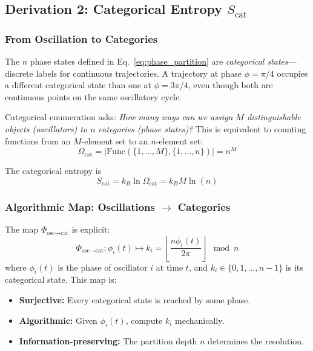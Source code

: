 \documentclass[twocolumn,10pt]{article}
\theoremstyle{remark}
\begin{document}
\subsection{Derivation 2: Categorical Entropy $S_{\text{cat}}$}

\subsubsection{From Oscillation to Categories}

The $n$ phase states defined in Eq.~\eqref{eq:phase_partition} are \textit{categorical states}—discrete labels for continuous trajectories. A trajectory at phase $\phi = \pi/4$ occupies a different categorical state than one at $\phi = 3\pi/4$, even though both are continuous points on the same oscillatory cycle.

Categorical enumeration asks: \textit{How many ways can we assign $M$ distinguishable objects (oscillators) to $n$ categories (phase states)?} This is equivalent to counting functions from an $M$-element set to an $n$-element set:
\begin{equation}
    \Omega_{\text{cat}} = |\text{Func}(\{1,\ldots,M\}, \{1,\ldots,n\})| = n^M
    \label{eq:Omega_cat}
\end{equation}

The categorical entropy is
\begin{equation}
    S_{\text{cat}} = k_B \ln \Omega_{\text{cat}} = k_B M \ln(n)
    \label{eq:S_cat_derivation}
\end{equation}

\subsubsection{Algorithmic Map: Oscillations $\to$ Categories}

The map $\Phi_{\text{osc} \to \text{cat}}$ is explicit:
\begin{equation}
    \Phi_{\text{osc} \to \text{cat}}: \phi_i(t) \mapsto k_i = \left\lfloor \frac{n \phi_i(t)}{2\pi} \right\rfloor \mod n
    \label{eq:map_osc_to_cat}
\end{equation}
where $\phi_i(t)$ is the phase of oscillator $i$ at time $t$, and $k_i \in \{0, 1, \ldots, n-1\}$ is its categorical state. This map is:
\begin{itemize}
    \item \textbf{Surjective:} Every categorical state is reached by some phase.
    \item \textbf{Algorithmic:} Given $\phi_i(t)$, compute $k_i$ mechanically.
    \item \textbf{Information-preserving:} The partition depth $n$ determines the resolution.
\end{itemize}
\end{document}
